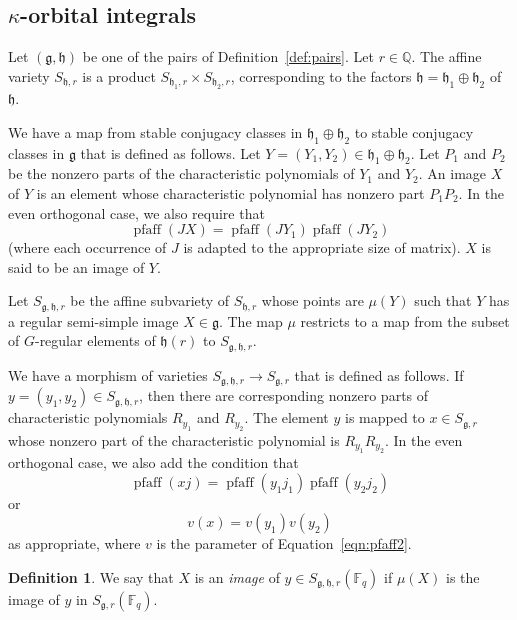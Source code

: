 \documentclass[11pt]{amsart}
\theoremstyle{definition}
\newtheorem{definition}[theorem]{Definition}
\theoremstyle{remark}
\numberwithin{equation}{theorem}
\def\f{{\mathbb{F}_q}}
\newcommand{\ring}[1]{\mathbb{#1}}
\def\op#1{\operatorname{#1}}
\def\lie#1{{\mathfrak{#1}}}
\begin{document}
\subsection{$\kappa$-orbital integrals}\label{section:kappa}

Let $(\lie{g},\lie{h})$ be one of the pairs of
Definition~\ref{def:pairs}.  Let $r\in \ring{Q}$.  The affine
variety $S_{\lie{h},r}$ is a product $S_{\lie{h_1},r}\times
S_{\lie{h_2},r}$, corresponding to the factors
$\lie{h}=\lie{h_1}\oplus \lie{h_2}$ of $\lie{h}$.


We have a map from stable conjugacy classes in
$\lie{h_1}\oplus\lie{h_2}$ to stable conjugacy classes in
$\lie{g}$ that is defined as follows.  Let
$Y=(Y_1,Y_2)\in\lie{h_1}\oplus\lie{h_2}$.  Let $P_1$ and $P_2$ be
the nonzero parts of the characteristic polynomials of $Y_1$ and
$Y_2$.  An image $X$ of $Y$ is an element whose characteristic
polynomial has nonzero part $P_1 P_2$.  In the even orthogonal
case, we also require that
    \begin{equation}
    \op{pfaff}(JX) = \op{pfaff}(JY_1)\op{pfaff}(JY_2)
    \end{equation}
(where each occurrence of $J$ is adapted to the appropriate size
of matrix).  $X$ is said to be an image of $Y$.

Let $S_{\lie{g},\lie{h},r}$ be the affine subvariety of
$S_{\lie{h},r}$ whose points are $\mu(Y)$ such that $Y$ has a
regular semi-simple image $X\in\lie{g}$.   The map $\mu$ restricts
to a map from the subset of $G$-regular elements of $\lie{h}(r)$
to $S_{\lie{g},\lie{h},r}$.

We have a morphism of varieties $S_{\lie{g},\lie{h},r}\to
S_{\lie{g},r}$ that is defined as follows.  If $y=(y_1,y_2)\in
S_{\lie{g},\lie{h},r}$, then there are corresponding nonzero parts
of characteristic polynomials $R_{y_1}$ and $R_{y_2}$.  The
element $y$ is mapped to $x\in S_{\lie{g},r}$ whose nonzero part
of the characteristic polynomial is $R_{y_1} R_{y_2}$. In the even
orthogonal case, we also add the condition that
   \begin{equation}\op{pfaff} (x j) = \op{pfaff} (y_1 j_1) \op{pfaff} (y_2
j_2)\end{equation}
or
   \begin{equation} v(x) = v(y_1) v(y_2)\end{equation}
as appropriate, where $v$ is the parameter of
Equation~\ref{eqn:pfaff2}.

\begin{definition}  We say that $X$ is an {\it image\/} of $y\in
S_{\lie{g},\lie{h},r}(\f)$ if $\mu(X)$ is the image of $y$ in
$S_{\lie{g},r}(\f)$.
\end{definition}
\end{document}

